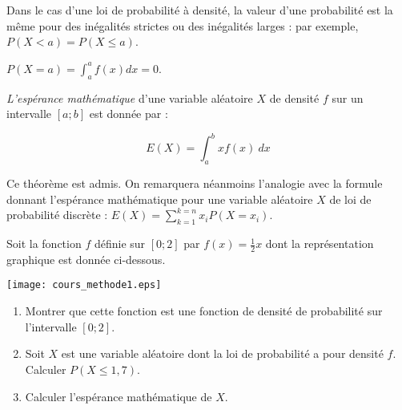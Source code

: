 \vspace{.5cm}

\begin{remarques}
 
\begin{dinglist}{43}
\itemsep1pt\parskip0pt
\item
  Dans le cas d'une loi de probabilité à densité, la valeur d'une
  probabilité est la même pour des inégalités strictes ou des inégalités
  larges : par exemple, \(P(X<a)=P(X\leqslant a)\).
\item
  \(P(X=a) = \int_a^a f(x)dx=0\).
\end{dinglist}

\end{remarques}

\vspace{.5cm}

\begin{definition}{}

\emph{L'espérance mathématique} d'une variable aléatoire \(X\) de
densité \(f\) sur un intervalle \([a;b]\) est donnée par :

\[E(X)=\int_a^b x f(x)~dx\]

\end{definition}

\vspace{.5cm}

\begin{remarque}
 
Ce théorème est admis. On remarquera néanmoins l'analogie avec la
formule donnant l'espérance mathématique pour une variable aléatoire
\(X\) de loi de probabilité discrète :
\(E(X)=\sum_{k=1}^{k=n}x_i P(X=x_i)\).

\end{remarque}

\vspace{.5cm}

\begin{methode}{}
 
Soit la fonction \(f\) définie sur \([0;2]\) par \(f(x)=\frac{1}{2}x\)
dont la représentation graphique est donnée ci-dessous.

\begin{center}
\texttt{[image: cours\_methode1.eps]}                                    \end{center}

\begin{enumerate}
\def\labelenumi{\arabic{enumi}.}
\itemsep1pt\parskip0pt
\item
  Montrer que cette fonction est une fonction de densité de probabilité
  sur l'intervalle \([0;2]\).
\item
  Soit \(X\) est une variable aléatoire dont la loi de probabilité a
  pour densité \(f\). Calculer \(P(X\leqslant1,7)\).
\item
  Calculer l'espérance mathématique de \(X\).
\end{enumerate}

\end{methode}

